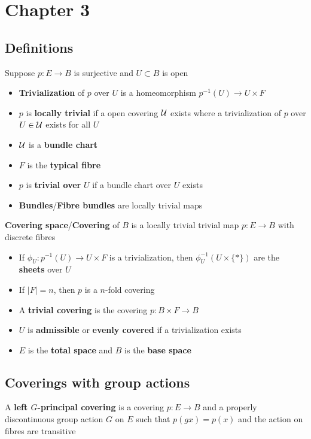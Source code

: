 \section{Chapter 3}

\subsection{Definitions}

Suppose $p:E\to B$ is surjective and $U\subset B$ is open
\begin{itemize}
    \item \textbf{Trivialization} of $p$ over $U$ is a homeomorphism $p^{-1}(U)\to U\times F$
    \item $p$ is \textbf{locally trivial} if a open covering $\mathcal U$ exists where a trivialization of $p$ over $U\in\mathcal U$ exists for all $U$
    \item $\mathcal U$ is a \textbf{bundle chart}
    \item $F$ is the \textbf{typical fibre} 
    \item $p$ is \textbf{trivial over} $U$ if a bundle chart over $U$ exists
    \item \textbf{Bundles}/\textbf{Fibre bundles} are locally trivial maps
\end{itemize}

\textbf{Covering space}/\textbf{Covering} of $B$ is a locally trivial trivial map $p:E\to B$ with discrete fibres
\begin{itemize}
    \item If $\phi_U:p^{-1}(U)\to U\times F$ is a trivialization, then $\phi_U^{-1}\left(U\times\{*\}\right)$ are the \textbf{sheets} over $U$
    \item If $|F|=n$, then $p$ is a $n$-fold covering
    \item A \textbf{trivial covering} is the covering $p:B\times F\to B$
    \item $U$ is \textbf{admissible} or \textbf{evenly covered} if a trivialization exists
    \item $E$ is the \textbf{total space} and $B$ is the \textbf{base space}
\end{itemize}

\subsection{Coverings with group actions}

A \textbf{left $G$-principal covering} is a covering $p:E\to B$ and a properly discontinuous group action $G$ on $E$ such that $p(gx)=p(x)$ and the action on fibres are transitive


